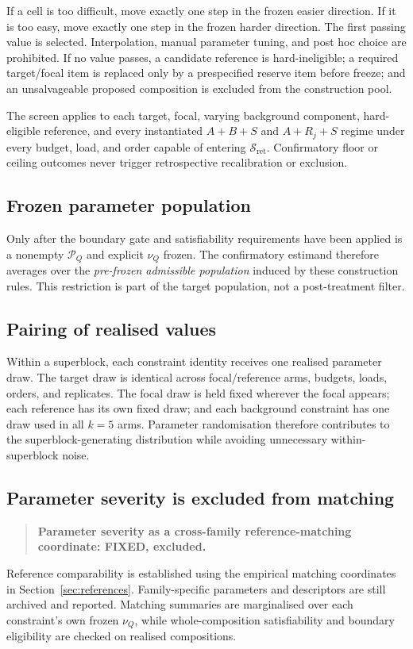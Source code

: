 \documentclass[11pt,a4paper]{article}
\newcommand{\Sc}{\mathcal S_{\mathrm{ret}}}
\begin{document}
If a cell is too difficult, move exactly one step in the frozen easier direction. If it is too easy, move exactly one step in the frozen harder direction. The first passing value is selected. Interpolation, manual parameter tuning, and post hoc choice are prohibited. If no value passes, a candidate reference is hard-ineligible; a required target/focal item is replaced only by a prespecified reserve item before freeze; and an unsalvageable proposed composition is excluded from the construction pool.

The screen applies to each target, focal, varying background component, hard-eligible reference, and every instantiated $A+B+S$ and $A+R_j+S$ regime under every budget, load, and order capable of entering $\Sc$. Confirmatory floor or ceiling outcomes never trigger retrospective recalibration or exclusion.

\subsection{Frozen parameter population}
Only after the boundary gate and satisfiability requirements have been applied is a nonempty $\mathcal P_Q$ and explicit $\nu_Q$ frozen. The confirmatory estimand therefore averages over the \emph{pre-frozen admissible population} induced by these construction rules. This restriction is part of the target population, not a post-treatment filter.

\subsection{Pairing of realised values}
Within a superblock, each constraint identity receives one realised parameter draw. The target draw is identical across focal/reference arms, budgets, loads, orders, and replicates. The focal draw is held fixed wherever the focal appears; each reference has its own fixed draw; and each background constraint has one draw used in all $k=5$ arms. Parameter randomisation therefore contributes to the superblock-generating distribution while avoiding unnecessary within-superblock noise.

\subsection{Parameter severity is excluded from matching}
\begin{quote}\textbf{Parameter severity as a cross-family reference-matching coordinate: FIXED, excluded.}\end{quote}
Reference comparability is established using the empirical matching coordinates in Section~\ref{sec:references}. Family-specific parameters and descriptors are still archived and reported. Matching summaries are marginalised over each constraint's own frozen $\nu_Q$, while whole-composition satisfiability and boundary eligibility are checked on realised compositions.
\end{document}
